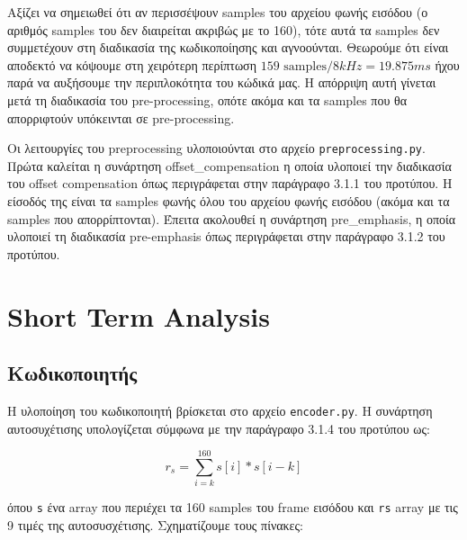 \documentclass{article}
\begin{document}
Αξίζει να σημειωθεί ότι αν περισσέψουν samples του αρχείου φωνής 
εισόδου (ο αριθμός samples του δεν διαιρείται ακριβώς με το 160),
τότε αυτά τα samples δεν συμμετέχουν στη διαδικασία της κωδικοποίησης
και αγνοούνται. Θεωρούμε ότι είναι αποδεκτό να κόψουμε στη 
χειρότερη περίπτωση $159 \text{ samples} / 8 kHz = 19.875 ms$ ήχου
παρά να αυξήσουμε την περιπλοκότητα του κώδικά μας. Η απόρριψη αυτή 
γίνεται μετά τη διαδικασία του pre-processing, οπότε ακόμα και
τα samples που θα απορριφτούν υπόκεινται σε pre-processing.

Οι λειτουργίες του preprocessing υλοποιούνται στο αρχείο 
\verb|preprocessing.py|. Πρώτα καλείται η συνάρτηση offset\_compensation
η οποία υλοποιεί την διαδικασία του offset compensation όπως περιγράφεται στην 
παράγραφο 3.1.1 του προτύπου. Η είσοδός της είναι τα samples φωνής όλου του 
αρχείου φωνής εισόδου (ακόμα και τα samples που απορρίπτονται). Έπειτα
ακολουθεί η συνάρτηση pre\_emphasis, η οποία υλοποιεί τη διαδικασία 
pre-emphasis όπως περιγράφεται στην παράγραφο 3.1.2 του προτύπου. 

\section{Short Term Analysis} 
\subsection{Κωδικοποιητής}
Η υλοποίηση του κωδικοποιητή βρίσκεται στο αρχείο \verb|encoder.py|.
Η συνάρτηση αυτοσυχέτισης 
υπολογίζεται σύμφωνα με την παράγραφο 3.1.4 του προτύπου ως:

\begin{equation}
    r_s = \sum_{i=k}^{160} s[i]*s[i-k]
\end{equation}

όπου \verb|s| ένα array που περιέχει τα 160 samples του frame εισόδου
και \verb|rs| array με τις 9 τιμές της αυτοσυσχέτισης.
Σχηματίζουμε τους πίνακες:
\end{document}
